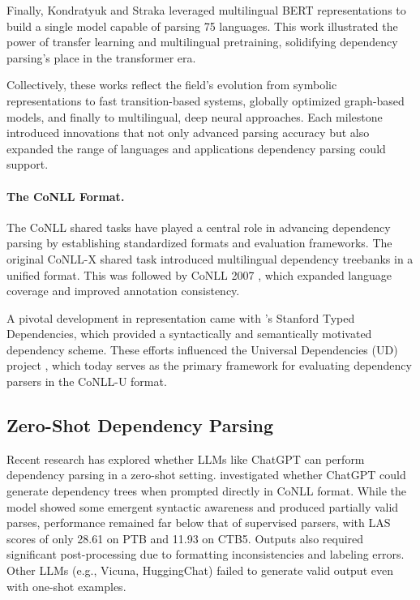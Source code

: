 Finally, Kondratyuk and Straka \cite{kondratyuk2019udpipe} leveraged multilingual BERT representations to build a single model capable of parsing 75 languages. This work illustrated the power of transfer learning and multilingual pretraining, solidifying dependency parsing’s place in the transformer era.

Collectively, these works reflect the field’s evolution from symbolic representations to fast transition-based systems, globally optimized graph-based models, and finally to multilingual, deep neural approaches. Each milestone introduced innovations that not only advanced parsing accuracy but also expanded the range of languages and applications dependency parsing could support.

\paragraph{The CoNLL Format.} The CoNLL shared tasks have played a central role in advancing dependency parsing by establishing standardized formats and evaluation frameworks. The original CoNLL-X shared task \citep{buchholz2006conll} introduced multilingual dependency treebanks in a unified format. This was followed by CoNLL 2007 \citep{nivre2007conll}, which expanded language coverage and improved annotation consistency.

A pivotal development in representation came with \citet{de2006generating}'s Stanford Typed Dependencies, which provided a syntactically and semantically motivated dependency scheme. These efforts influenced the Universal Dependencies (UD) project \citep{nivre2016universal}, which today serves as the primary framework for evaluating dependency parsers in the CoNLL-U format.

\subsection{Zero-Shot Dependency Parsing}

Recent research has explored whether LLMs like ChatGPT can perform dependency parsing in a zero-shot setting. \citet{lin2023chatgpt} investigated whether ChatGPT could generate dependency trees when prompted directly in CoNLL format. While the model showed some emergent syntactic awareness and produced partially valid parses, performance remained far below that of supervised parsers, with LAS scores of only 28.61 on PTB and 11.93 on CTB5. Outputs also required significant post-processing due to formatting inconsistencies and labeling errors. Other LLMs (e.g., Vicuna, HuggingChat) failed to generate valid output even with one-shot examples.

